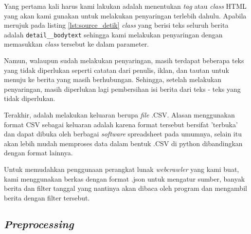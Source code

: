 Yang pertama kali harus kami lakukan adalah menentukan \textit{tag} atau \textit{class} HTML yang akan kami gunakan untuk melakukan penyaringan terlebih dahulu. Apabila merujuk pada listing \ref{lst:source_detik} \textit{class} yang berisi teks seluruh berita adalah \texttt{detail\_\_body\-text} sehingga kami melakukan penyaringan dengan memasukkan \textit{class} tersebut ke dalam parameter.

Namun, walaupun sudah melakukan penyaringan, masih terdapat beberapa teks yang tidak diperlukan seperti catatan dari penulis, iklan, dan tautan untuk menuju ke berita yang masih berhubungan. Sehingga, setelah melakukan penyaringan, masih diperlukan lagi pembersihan isi berita dari teks - teks yang tidak diperlukan.

Terakhir, adalah melakukan keluaran berupa \textit{file} .CSV. Alasan menggunakan format CSV sebagai keluaran adalah karena format tersebut bersifat 'terbuka' dan dapat dibuka oleh berbagai \textit{software} spreadsheet pada umumnya, selain itu akan lebih mudah memproses data dalam bentuk .CSV di python dibandingkan dengan format lainnya.

Untuk memudahkan penggunaan perangkat lunak \textit{webcrawler} yang kami buat, kami menggunakan berkas dengan format .json untuk mengatur sumber, banyak berita dan filter tanggal yang nantinya akan dibaca oleh program dan mengambil berita dengan filter tersebut.

\subsection{\textit{Preprocessing}}

